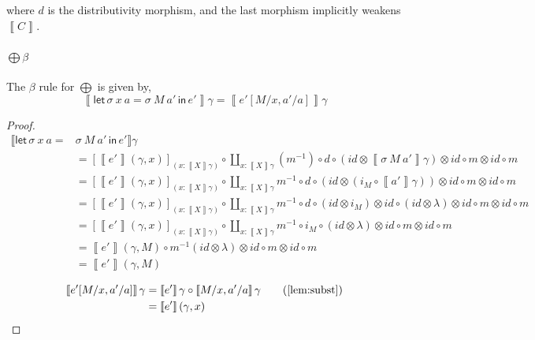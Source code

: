 \documentclass[acmsmall,nonacm]{acmart}
\newcommand{\sem}[1]{\left\llbracket{#1}\right\rrbracket}
\newcommand{\semg}[1]{\sem{#1}\gamma}
\newcommand{\letin}[3]{\mathsf{let}\, #1 = #2 \, \mathsf{in}\, #3}
\begin{document}
where $d$ is the distributivity morphism, and the last morphism implicitly
weakens $\sem{C}$.

\paragraph{$\bigoplus\beta$}
The $\beta$ rule for $\bigoplus$ is given by,
\[
  \semg{\letin {\sigma~x~a} {\sigma~M~a'} {e'}} = \semg{e'[M/x,a'/a]}
\]
\begin{proof}
  \begin{align*}
  \llbracket \mathsf{let}\, {\sigma~x~a} = & {\sigma~M~a'} \, \mathsf{in}\, {e'} \rrbracket \gamma \\
  & = {[ \sem{e'}(\gamma , x) ]_{(x : \semg{X})}} \circ \coprod_{x:\semg{X}}(m^{-1}) \circ d \circ (id
  \otimes \semg{\sigma~M~a'}) \otimes id \circ m \otimes id \circ m \\
  & = {[ \sem{e'}(\gamma , x) ]_{(x : \semg{X})}} \circ \coprod_{x:\semg{X}}m^{-1} \circ d \circ (id
  \otimes (i_M \circ \semg{a'})) \otimes id \circ m \otimes id \circ m \\
  & = {[ \sem{e'}(\gamma , x) ]_{(x : \semg{X})}} \circ \coprod_{x:\semg{X}} m^{-1} \circ d \circ (id \otimes i_M) \otimes id \circ (id \otimes  \lambda) \otimes id \circ m \otimes id \circ m \\
  & = {[ \sem{e'}(\gamma , x) ]_{(x : \semg{X})}} \circ \coprod_{x:\semg{X}} m^{-1} \circ i_M \circ (id \otimes  \lambda) \otimes id \circ m \otimes id \circ m \\
  & = \sem{e'}(\gamma , M) \circ m^{-1} (id \otimes  \lambda) \otimes id \circ m \otimes id \circ m \\
  & = \sem{e'}(\gamma , M) \tag{coherence}
  \end{align*}

  \begin{align*}
    \semg{e'[M/x,a'/a]}
    &= \semg{e'} \circ \semg{M/x,a'/a} \tag{\cref{lem:subst}} \\
    &= \sem{e'}(\gamma , x)
  \end{align*}
\end{proof}
\end{document}
